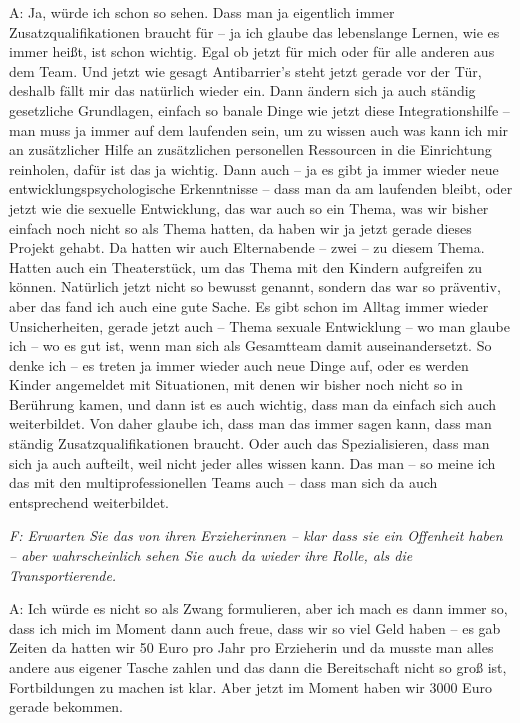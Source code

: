 \begin{linenumbers*}
A: Ja, würde ich schon so sehen. Dass man ja eigentlich immer Zusatzqualifikationen braucht für – ja ich glaube das lebenslange Lernen, wie es immer heißt, ist schon wichtig. Egal ob jetzt für  mich oder für alle anderen aus dem Team. Und jetzt wie gesagt Antibarrier's steht jetzt gerade vor der Tür,  deshalb fällt mir das natürlich wieder ein. Dann ändern sich ja auch ständig gesetzliche Grundlagen, einfach so banale Dinge wie jetzt diese Integrationshilfe – man muss ja immer auf dem laufenden sein, um zu wissen auch was kann ich mir an zusätzlicher Hilfe an zusätzlichen personellen Ressourcen in die Einrichtung reinholen, dafür ist das ja wichtig. Dann auch – ja es gibt ja immer wieder neue entwicklungspsychologische Erkenntnisse – dass man da am laufenden bleibt, oder jetzt wie die sexuelle Entwicklung, das war auch so ein Thema, was wir bisher einfach noch nicht so als Thema hatten, da haben wir ja jetzt gerade dieses Projekt gehabt. Da hatten wir auch Elternabende – zwei – zu diesem Thema. Hatten auch ein Theaterstück, um das Thema mit den Kindern aufgreifen zu können. Natürlich jetzt nicht so bewusst genannt, sondern das war so präventiv, aber das fand ich auch eine gute Sache. Es gibt schon im Alltag immer wieder Unsicherheiten, gerade jetzt auch – Thema sexuale Entwicklung – wo man glaube ich – wo es gut ist, wenn man sich als Gesamtteam damit auseinandersetzt. So denke ich – es treten ja immer wieder auch neue Dinge auf, oder es werden Kinder angemeldet mit Situationen, mit denen wir bisher noch nicht so in Berührung kamen, und dann ist es auch wichtig, dass man da einfach sich auch weiterbildet. Von daher glaube ich, dass man das immer sagen kann, dass man ständig Zusatzqualifikationen braucht. Oder auch das Spezialisieren, dass man sich ja auch aufteilt, weil nicht jeder alles wissen kann. Das man – so meine ich das mit den multiprofessionellen Teams auch – dass man sich da auch entsprechend weiterbildet.

\emph{F: Erwarten Sie das von ihren Erzieherinnen – klar dass sie ein Offenheit haben – aber wahrscheinlich sehen Sie auch da wieder ihre Rolle, als die Transportierende.}

A: Ich würde es nicht so als Zwang formulieren, aber ich mach es dann immer so, dass ich mich im Moment dann auch freue, dass wir so viel Geld haben – es gab Zeiten da hatten wir 50 Euro pro Jahr pro Erzieherin und da musste man alles andere aus eigener Tasche zahlen und das dann die Bereitschaft nicht so groß ist, Fortbildungen zu machen ist klar. Aber jetzt im Moment haben wir 3000 Euro gerade bekommen.


\end{linenumbers*}
